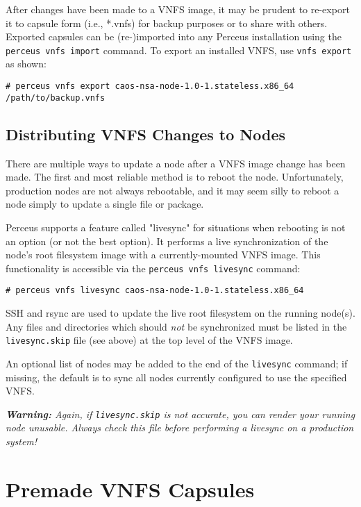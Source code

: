 \documentclass[10pt,letterpaper]{report}
\begin{document}
After changes have been made to a VNFS image, it may be prudent to re-export
it to capsule form (i.e., *.vnfs) for backup purposes or to share with others.
Exported capsules can be (re-)imported into any Perceus installation using the
{\tt perceus vnfs import} command.  To export an installed VNFS, use {\tt vnfs
export} as shown:

\begin{verbatim}
# perceus vnfs export caos-nsa-node-1.0-1.stateless.x86_64 /path/to/backup.vnfs
\end{verbatim}

\subsection{Distributing VNFS Changes to Nodes}

There are multiple ways to update a node after a VNFS image change has been
made.  The first and most reliable method is to reboot the node.
Unfortunately, production nodes are not always rebootable, and it may seem
silly to reboot a node simply to update a single file or package.

Perceus supports a feature called "livesync" for situations when rebooting is
not an option (or not the best option).  It performs a live synchronization of
the node's root filesystem image with a currently-mounted VNFS image.  This
functionality is accessible via the {\tt perceus vnfs livesync} command:

\begin{verbatim}
# perceus vnfs livesync caos-nsa-node-1.0-1.stateless.x86_64
\end{verbatim}

SSH and rsync are used to update the live root filesystem on the running
node(s).  Any files and directories which should {\it not} be synchronized
must be listed in the {\tt livesync.skip} file (see above) at the top level of
the VNFS image.

An optional list of nodes may be added to the end of the {\tt livesync}
command; if missing, the default is to sync all nodes currently configured to
use the specified VNFS.

{\it {\bf Warning:}  Again, if {\tt livesync.skip} is not accurate, you can
render your running node unusable.  Always check this file before performing a
livesync on a production system!}

\section{Premade VNFS Capsules}
\end{document}
